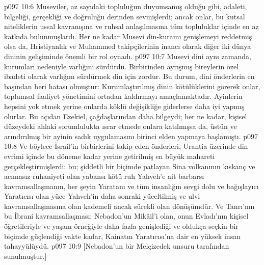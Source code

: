 \vs p097 10:6 Museviler, az sayıdaki topluluğun duyumsamış olduğu gibi, adaleti, bilgeliği, gerçekliği ve doğruluğu derinden sevmişlerdi; ancak onlar, bu kutsal niteliklerin ussal kavranışına ve ruhsal anlaşılmasına tüm topluluklar içinde en az katkıda bulunmuşlardı. Her ne kadar Musevi din\hyp{}kuramı genişlemeyi reddetmiş olsa da, Hristiyanlık ve Muhammed takipçilerinin inancı olarak diğer iki dünya dininin gelişiminde önemli bir rol oynadı.
\vs p097 10:7 Musevi dini aynı zamanda, kurumları nedeniyle varlığını sürdürdü. Birbirinden ayrışmış bireylerin özel ibadeti olarak varlığını sürdürmek din için zordur. Bu durum, dini önderlerin en başından beri hatası olmuştur: Kurumlaştırılmış dinin kötülüklerini görerek onlar, toplumsal faaliyet yönetimini ortadan kaldırmayı amaçlamaktadır. Ayinlerin hepsini yok etmek yerine onlarda köklü değişikliğe giderlerse daha iyi yapmış olurlar. Bu açıdan Ezekiel, çağdaşlarından daha bilgeydi; her ne kadar, kişisel düzeydeki ahlaki sorumlulukta ısrar etmede onlara katılmışsa da, üstün ve arındırılmış bir ayinin sadık uygulamasını birinci elden yapmaya başlamıştı.
\vs p097 10:8 Ve böylece İsrail’in birbirlerini takip eden önderleri, Urantia üzerinde din evrimi içinde bu döneme kadar yerine getirilmiş en büyük mahareti gerçekleştirmişlerdi: bu; şiddetli bir biçimde patlayan Sina volkanının kıskanç ve acımasız ruhaniyeti olan yabansı kötü ruh Yahveh’e ait barbarsı kavramsallaşmanın, her şeyin Yaratanı ve tüm insanlığın sevgi dolu ve bağışlayıcı Yaratıcısı olan yüce Yahveh’in daha sonraki yüceltilmiş ve ulvi kavramsallaşmasına olan kademeli ancak sürekli olan dönüşümdür. Ve Tanrı’nın bu İbrani kavramsallaşması; Nebadon’un Mikâil’i olan, onun Evladı’nın kişisel öğretileriyle ve yaşam örneğiyle daha fazla genişlediği ve oldukça seçkin bir biçimde güçlendiği vakte kadar, Kainatın Yaratıcısı’na dair en yüksek insan tahayyülüydü.
\vs p097 10:9 [Nebadon’un bir Melçizedek unsuru tarafından sunulmuştur.]
